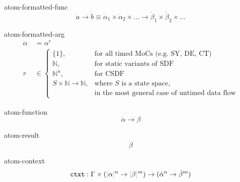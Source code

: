 \documentclass[preview]{standalone}
\begin{document}

\begin{docimage}{atom-formatted-func}
  \begin{equation*}%
    \dot{a} \rightarrow \dot{b}
    \equiv \dot{\alpha}_1 \times \dot{\alpha}_2 \times ...
    \rightarrow \dot{\beta}_1 \times \dot{\beta}_2 \times ...  
  \end{equation*}
\end{docimage} 

\begin{docimage}{atom-formatted-arg}
  \begin{align*}%
    \dot{\alpha}&\ = \alpha^r\\
    r&\ \in
    \begin{cases}
      \{1\}, & \text{for all timed MoCs (e.g. SY, DE, CT)} \\
      \mathbb{N}, & \text{for static variants of SDF}\\
      \mathbb{N}^n, & \text{for CSDF}\\
      S \times \mathbb{N} \rightarrow \mathbb{N}, & \text{where } S \text{ is a state space,} \\
        & \text{in the most general case of untimed data flow}
    \end{cases}
  \end{align*}
\end{docimage} 

\begin{docimage}{atom-function}
  \begin{equation*}%
    \dot{\alpha} \rightarrow \beta
  \end{equation*}
\end{docimage} 

\begin{docimage}{atom-result}
  \begin{equation*}%
    {\dot{\beta}}
  \end{equation*}
\end{docimage} 

\begin{docimage}{atom-context}
  \begin{equation*}%
    \mathtt{ctxt} : \Gamma \times ({\color{black!40}[}\alpha{\color{black!40}]}^n \rightarrow {\color{black!40}[}\beta{\color{black!40}]}^m )
    \rightarrow ({\dot{\alpha}^n \rightarrow \dot{\beta}^m})
  \end{equation*}
\end{docimage} 

\end{document}
